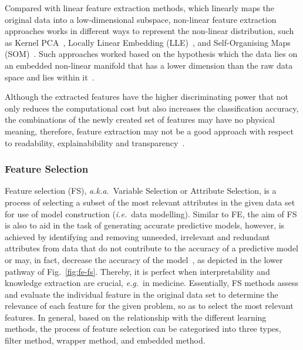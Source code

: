 \documentclass{article}
\newcommand{\zzie}{\emph{i.e.}~}
\newcommand{\zzeg}{\emph{e.g.}~}
\newcommand{\zzaka}{\emph{a.k.a.}~}
\newcommand*{\1}{\textcolor{red}}
\begin{document}
Compared with linear feature extraction methods, which linearly maps the original data into a low-dimensional subspace, non-linear feature extraction approaches works in different ways to represent the non-linear distribution, such as Kernel PCA~\cite{aziz2017dimension}, Locally Linear Embedding (LLE)~\cite{aziz2017dimension}, and Self-Organising Maps (SOM)~\cite{li2019machine}. Such approaches worked based on the hypothesis which the data lies on an embedded non-linear manifold that has a lower dimension than the raw data space and lies within it~\cite{aziz2017dimension}. 

Although the extracted features have the higher discriminating power that not only reduces the computational cost but also increases the classification accuracy, the combinations of the newly created set of features may have no physical meaning, therefore, feature extraction may not be a good approach with respect to readability, explainabibility and transparency~\cite{remeseiro2019review}. 

\subsubsection{Feature Selection}\label{sec:fs}
Feature selection (FS), \zzaka Variable Selection or Attribute Selection, is a process of selecting a subset of the most relevant attributes in the given data set for use of model construction (\zzie data modelling). Similar to FE, the aim of FS is also to aid in the task of generating accurate predictive models, however, is achieved by identifying and removing unneeded, irrelevant and redundant attributes from data that do not contribute to the accuracy of a predictive model or may, in fact, decrease the accuracy of the model~\cite{zuo2018grooming}, as depicted in the lower pathway of Fig.~\ref{fig:fe-fs}. Thereby, it is perfect when interpretability and knowledge extraction are crucial, \zzeg in medicine. Essentially, FS methods assess and evaluate the individual feature in the original data set to determine the relevance of each feature for the given problem, so as to select the most relevant features. In general, based on the relationship with the different learning methods, the process of feature selection can be categorised into three types, filter method, wrapper method, and embedded method. 
\end{document}

